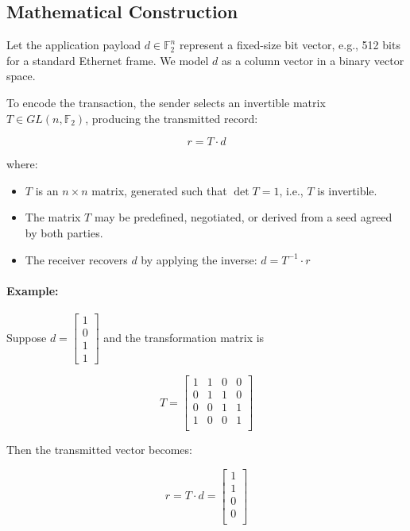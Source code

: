 \documentclass[../../../OAE-SPEC-MAIN.tex]{subfiles}
\begin{document}
\subsection{Mathematical Construction}

Let the application payload $d \in \mathbb{F}_2^n$ represent a fixed-size bit vector, e.g., 512 bits for a standard Ethernet frame. We model $d$ as a column vector in a binary vector space.

To encode the transaction, the sender selects an invertible matrix $T \in GL(n, \mathbb{F}_2)$, producing the transmitted record:

\[
r = T \cdot d
\]

\noindent where:
\begin{itemize}
  \item $T$ is an $n \times n$ matrix, generated such that $\det T = 1$, i.e., $T$ is invertible.
  \item The matrix $T$ may be predefined, negotiated, or derived from a seed agreed by both parties.
  \item The receiver recovers $d$ by applying the inverse: $d = T^{-1} \cdot r$
\end{itemize}

\paragraph{Example:}
Suppose $d = \begin{bmatrix} 1 \\ 0 \\ 1 \\ 1 \end{bmatrix}$ and the transformation matrix is

\[
T =
\begin{bmatrix}
1 & 1 & 0 & 0 \\
0 & 1 & 1 & 0 \\
0 & 0 & 1 & 1 \\
1 & 0 & 0 & 1 \\
\end{bmatrix}
\]

Then the transmitted vector becomes:

\[
r = T \cdot d = 
\begin{bmatrix}
1 \\
1 \\
0 \\
0 \\
\end{bmatrix}
\]
\end{document}
